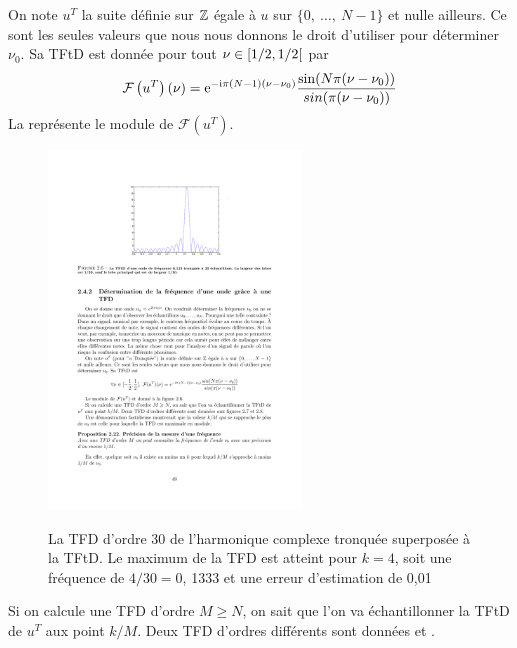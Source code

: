 On note $u^{T}$ la suite d\'{e}finie sur $\mathbb{Z}$ \'{e}gale \`{a} $u$ sur $\{0,\ \ldots,\ N-1\}$ et nulle ailleurs. Ce sont les seules valeurs que nous nous donnons le droit d'utiliser pour d\'{e}terminer $\nu_{0}$. Sa TFtD est donnée pour tout
$\nu\in \left[1/2,1/2\right[$ par
$$
\mathcal{F}\left( u^{T} \right)(\nu)=\mathrm{e}^{-\mathrm{i} \pi (N-1)(\nu- \nu_0)} \frac{\sin(N\pi(\nu-\nu_{0}))}{sin(\pi(\nu-\nu_{0}))}
$$
La  représente le module de $\mathcal{F}(u^{T})$.
\begin{figure}
  \centering
  \includegraphics[width=0.6\textwidth]{Figures/Figure2-6}\\
  \caption{La TFD d'ordre 30 de l'harmonique complexe tronqu\'{e}e superpos\'{e}e \`{a} la TFtD. Le maximum de la TFD est atteint pour $k=4$, soit une fr\'{e}quence de $4/30=0$, 1333 et une erreur d'estimation de 0,01}\label{fig:figure2-6}
\end{figure}


Si on calcule une TFD d'ordre $M\geq N$, on sait que l'on va \'{e}chantillonner la TFtD de $u^{T}$ aux point $k/M$. Deux TFD d'ordres diff\'{e}rents sont donn\'{e}es  et .


